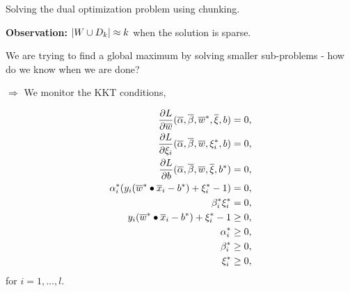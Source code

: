 \documentclass[a4paper,blends,pdf,colorBG,slideColor]{prosper}
\begin{document}
\small
{}
\begin{center}
Solving the dual optimization problem using chunking.
\end{center}

\vspace{.2in}
{\bf Observation:} $|{W \cup D_k}| \approx k$ when the solution is sparse.
\es

\small
We are trying to find a global maximum by solving smaller sub-problems - how do we know when 
we are done?

$\Rightarrow$ We monitor the KKT conditions,

\begin{align*}
\frac{\partial L}{\partial \overline{w}}(\overline{\alpha},\overline{\beta}, \overline{w}^*,\overline{\xi},b) &= 0,\\
\frac{\partial L}{\partial \xi_i}(\overline{\alpha},\overline{\beta},\overline{w},\xi^*_i,b) &= 0,\\
\frac{\partial L}{\partial b}(\overline{\alpha},\overline{\beta},\overline{w},\overline{\xi},b^*) &= 0,\\
\alpha^*_i (y_i(\overline{w}^*\bullet\overline{x}_i - b^*) + \xi^*_i -1)&= 0, \\
\beta^*_i\xi^*_i&= 0,\\
y_i(\overline{w}^*\bullet\overline{x}_i - b^*) + \xi^*_i -1&\ge 0, \\
\alpha^*_i &\ge 0,\\
\beta^*_i &\ge 0,\\
\xi^*_i &\ge 0,
\end{align*}
for $i = 1,\ldots,l$.
\es
\end{document}
